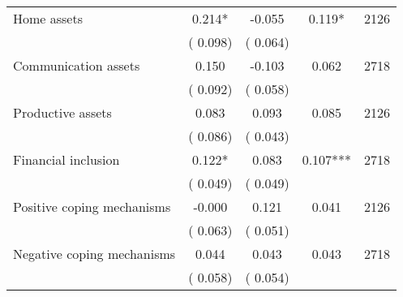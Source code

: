 \begin{tabular}{l*{4}{c}}
 Home assets                       &              0.214* &        -0.055            &              0.119*     & 2126                             \\  
                                       &          (       0.098)               &        (       0.064)                                &                                               &                                               \\      

 Communication assets                       &              0.150 &        -0.103            &              0.062     & 2718                             \\  
                                       &          (       0.092)               &        (       0.058)                                &                                               &                                               \\      

 Productive assets                       &              0.083 &         0.093            &              0.085     & 2126                             \\  
                                       &          (       0.086)               &        (       0.043)                                &                                               &                                               \\      

 Financial inclusion                       &              0.122* &         0.083            &              0.107***     & 2718                             \\  
                                       &          (       0.049)               &        (       0.049)                                &                                               &                                               \\      

 Positive coping mechanisms                       &             -0.000 &         0.121            &              0.041     & 2126                             \\  
                                       &          (       0.063)               &        (       0.051)                                &                                               &                                               \\      

 Negative coping mechanisms                       &              0.044 &         0.043            &              0.043     & 2718                             \\  
                                       &          (       0.058)               &        (       0.054)                                &                                               &                                               \\      


\end{tabular}
